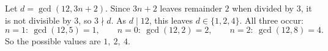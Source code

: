 Let $d=\gcd(12,3n+2)$. Since $3n+2$ leaves remainder $2$ when divided by $3$, it is not divisible by $3$, so $3\nmid d$. As $d\mid12$, this leaves $d\in\{1,2,4\}$. All three occur:
\[n=1:\ \gcd(12,5)=1,\qquad n=0:\ \gcd(12,2)=2,\qquad n=2:\ \gcd(12,8)=4.\]
So the possible values are $\boxed{1,\ 2,\ 4}$.
